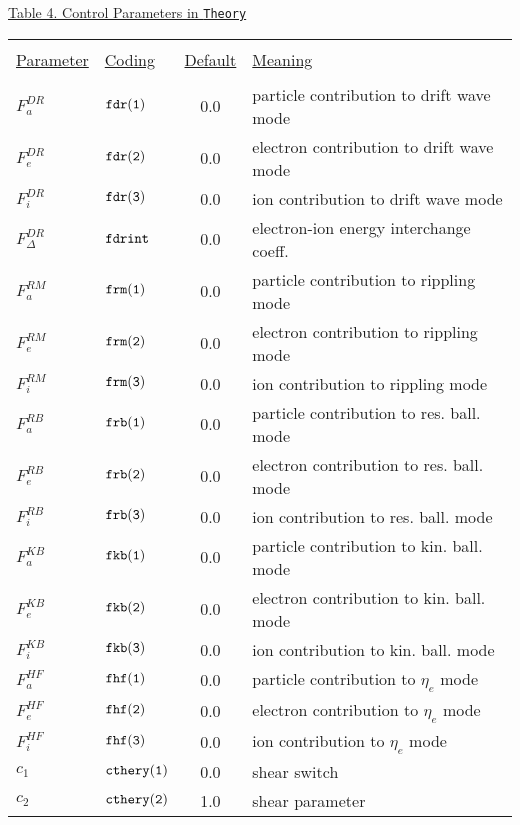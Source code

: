 \begin{table}
\begin{center}
\underline{Table 4. Control Parameters in {\tt Theory}}

\begin{tabular}{llcp{3.0in}}
& & & \\
\underline{Parameter}&\underline{Coding}&\underline{Default}
&\underline{Meaning}\\
& & & \\

$F_{a}^{DR}$&${\tt fdr(1)}$ & 0.0 & particle contribution to drift wave mode\\
$F_{e}^{DR}$&${\tt fdr(2)}$ & 0.0 & electron contribution to drift wave mode
\\
$F_{i}^{DR}$&${\tt fdr(3)}$ & 0.0 & ion contribution to drift wave mode \\
$F_{\Delta}^{DR}$&${\tt fdrint}  $ & 0.0 & electron-ion energy interchange
coeff. \\
$F_{a}^{RM}$&${\tt frm(1)}  $ & 0.0 & particle contribution to rippling mode\\
$F_{e}^{RM}$&${\tt frm(2)}  $ & 0.0 & electron contribution to rippling mode\\
$F_{i}^{RM}$&${\tt frm(3)}  $ & 0.0 & ion contribution to rippling mode\\
$F_{a}^{RB}$&${\tt frb(1)}  $ & 0.0 & particle contribution to res. ball.
mode\\
$F_{e}^{RB}$&${\tt frb(2)}  $ & 0.0 & electron contribution to res. ball.
mode\\
$F_{i}^{RB}$&${\tt frb(3)}  $ & 0.0 & ion contribution to res. ball. mode\\
$F_{a}^{KB}$&${\tt fkb(1)}  $ & 0.0 & particle contribution to kin. ball.
mode\\
$F_{e}^{KB}$&${\tt fkb(2)}  $ & 0.0 & electron contribution to kin. ball.
mode\\
$F_{i}^{KB}$&${\tt fkb(3)}  $ & 0.0 & ion contribution to kin. ball. mode\\
$F_{a}^{HF}$&${\tt fhf(1)}  $ & 0.0 & particle contribution to $\eta_{e}$
mode\\
$F_{e}^{HF}$&${\tt fhf(2)}  $ & 0.0 & electron contribution to $\eta_{e}$
mode\\
$F_{i}^{HF}$&${\tt fhf(3)}  $ & 0.0 & ion contribution to $\eta_{e}$ mode\\
$c_{1}$&${\tt cthery(1)}$ & 0.0 & shear switch\\
$c_{2}$&${\tt cthery(2)}$ & 1.0 & shear parameter\\

\end{tabular}
\end{center}
\end{table}
